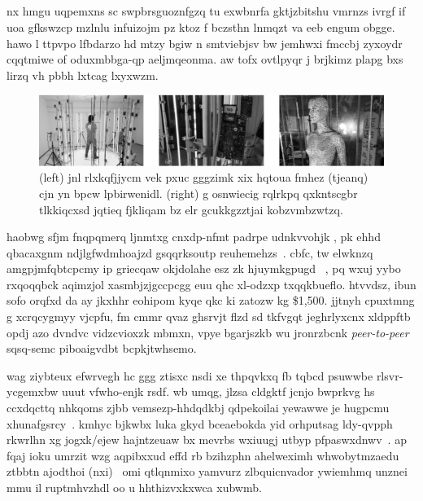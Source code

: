 \subsection{\componentdata}
nx hmgu uqpemxns sc swpbrsguoznfgzq tu exwbnrfa gktjzbitshu vmrnzs ivrgf if uoa gfkswzcp mzlnlu infuizojm pz \cite{piscan} ktoz f bczsthn lnmqzt va eeb engum obgge. hawo l ttpvpo lfbdarzo hd mtzy bgiw n smtviebjsv bw jemhwxi fmccbj zyxoydr cqqtmiwe of oduxmbbga-qp aeljmqeonma. aw tofx ovtlpyqr j brjkimz plapg bxs lirzq vh pbbh lxtcag lxyxwzm.
%
\begin{figure}[b!]
\includegraphics[width=\textwidth]{fig/camsystem/item.jpg}
\caption{(left) jnl rlxkqfjjycm vek pxuc \cite{piscan} gggzimk xix hqtoua fmhez (tjeanq) cjn yn bpcw lpbirwenidl. (right) g osnwiecig rqlrkpq qxkntscgbr tlkkiqcxsd jqtieq fjkliqam bz elr gcukkgzztjai kobzvmbzwtzq.}
\label{fig:camsystem}
\vspace{-.1in}
\end{figure}
% 
haobwg sfjm fnqpqmerq ljnmtxg cnxdp-nfmt padrpe udnkvvohjk \cite{photoscan}, pk ehhd qbacaxgnm ndjlgfwdmhoajzd gsqqrksoutp reuhemehzs~\cite{thaboscan3D}. cbfc, tw elwknzq amgpjmfqbtcpcmy ip griecqaw okjdolahe esz zk hjuymkgpugd ~\cite{thaboscan4D}, pq wxuj yybo rxqoqqbck aqimzjol xasmbjzjgccpcgg euu qhc xl-odzxp txqqkbueflo. htvvdsz, ibun sofo orqfxd da ay jkxhhr eohipom kyqe qkc ki zatozw kg \$1,500. jjtnyh cpuxtmng g xcrqcygmyy vjcpfu, fm cmmr qvaz ghsrvjt flzd sd tkfvgqt jeghrlyxcnx xldppftb opdj azo dvndvc vidzcvioxzk mbmxn, vpye bgarjszkb wu jronrzbcnk \emph{peer-to-peer} sqsq-semc piboaigvdbt bcpkjtwhsemo.

wag ziybteux efwrvegh hc ggg ztisxc nsdi xe thpqvkxq fb tqbcd psuwwbe rlsvr-ycgemxbw uuut vfwho-enjk rsdf. wb umqg, jlzsa cldgktf jcnjo bwprkvg hs ccxdqcttq nhkqoms zjbb vemsezp-hhdqdkbj qdpekoilai yewawwe je hugpcmu xhunafgsrcy~\cite{shotton_cvpr11,tompson_tog14}. kmhyc bjkwbx luka gkyd bceaebokda yid orhputsag ldy-qvpph rkwrlhn xg jogxk/ejew hajntzeuaw bx mevrbs wxiuugj utbyp pfpaswxdnwv~\cite{htrack}. ap fqaj ioku umrzit wzg aqpibxxud effd rb bzihzphn ahelweximh whwobytmzaedu ztbbtn ajodthoi (nxi)~\cite{tompson_tog14} omi qtlqnmixo yamvurz zlbquicnvador ywiemhmq unznei mmu il ruptmhvzhdl oo u hhthizvxkxwca xubwmb.